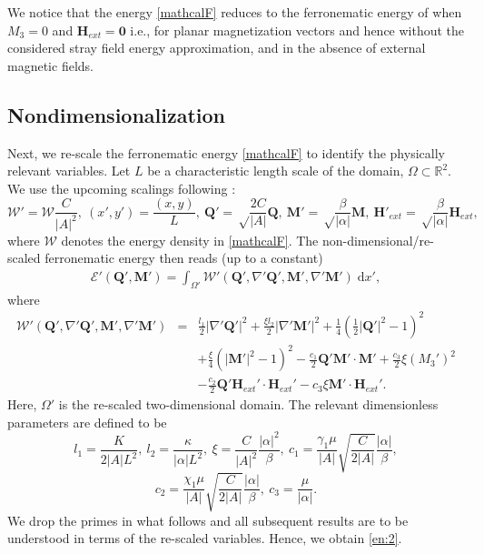 \documentclass{article}
\def\Qvec{\mathbf{Q}}
\def \Mvec{\mathbf{M}}
\def\Hvec{\mathbf{H}}
\def\d{\mathrm{d}}
\begin{document}
We notice that the energy \eqref{mathcalF} reduces to the ferronematic energy of \cite{Bisht2020} when $M_3=0$ and $\Hvec_{ext}=\mathbf{0}$ i.e., for planar magnetization vectors and hence without the considered stray field energy approximation, and in the absence of external magnetic fields.

\subsection{Nondimensionalization}
\label{sec:nondim}
Next, we re-scale the ferronematic energy \eqref{mathcalF} to identify the physically relevant variables. Let $L$ be a characteristic length scale of the domain, $\Omega\subset\mathbb R^2$.  We use the upcoming scalings following \cite{Bisht2020}: $$\mathcal{W'}=\mathcal{W}\frac{C}{|A|^2},~\left(x', y'\right)=\frac{\left(x, y\right)}{L},~\Qvec'=\sqrt\frac{2C}{|A|}\Qvec,~\Mvec'=\sqrt\frac{\beta}{|\alpha|}\Mvec,~\Hvec'_{ext}=\sqrt\frac{\beta}{|\alpha|}\Hvec_{ext},$$
where $\mathcal{W}$ denotes the energy density in \eqref{mathcalF}.
The non-dimensional/re-scaled ferronematic energy then reads (up to a constant)  
\begin{equation}
\begin{aligned}
\mathcal{E}'\left(\Qvec', \Mvec'\right) = \int_{\Omega'}\mathcal{W}'\left(\Qvec', \nabla'\Qvec', \Mvec', \nabla'\Mvec'\right)\;\d x',\label{eq:en12}
\end{aligned}
\end{equation}
where
\begin{eqnarray}
\mathcal{W'}\left(\Qvec', \nabla'\Qvec', \Mvec', \nabla'\Mvec'\right)&=&\frac{l_1}{2}|\nabla' \Qvec'|^2 + \frac{\xi l_2}{2}|\nabla' \Mvec'|^2 + \frac{1}{4}\left(\frac{1}{2}|\Qvec'|^2 - 1\right)^2 \\ &&+ \frac{\xi}{4}\left(|\Mvec'|^2 - 1\right)^2 - \frac{c_1}{2}\Qvec'\Mvec'\cdot\Mvec'+ \frac{c_3}{2}\xi\left(M_3'\right)^2 \\
&&- \frac{c_2}{2}\Qvec'\Hvec_{ext}'\cdot\Hvec_{ext}' - c_3\xi\Mvec'\cdot\Hvec_{ext}'.\nonumber
\end{eqnarray}
Here, $\Omega'$ is the re-scaled two-dimensional domain.
The relevant dimensionless parameters are defined to be
$$l_1=\frac{K}{2|A|L^2},~l_2=\frac{\kappa}{|\alpha| L^2},~\xi=\frac{C}{|A|^2}\frac{|\alpha|^2}{\beta},~c_1=\frac{\gamma_1\mu}{|A|}\sqrt{\frac{C}{2|A|}}\frac{|\alpha|}{\beta},$$
$$c_2=\frac{\chi_1\mu}{|A|}\sqrt{\frac{C}{2|A|}}\frac{|\alpha|}{\beta},~c_3=\frac{\mu}{|\alpha|}.$$
We drop the primes in what follows and all subsequent results are to be understood in terms of the re-scaled variables. Hence, we obtain \eqref{en:2}.
\end{document}
